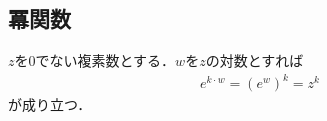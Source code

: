 \subsection{冪関数}
	$z$を$0$でない複素数とする．$w$を$z$の対数とすれば
	\begin{align}
		e^{k \cdot w} = (e^{w})^k = z^k
	\end{align}
	が成り立つ．